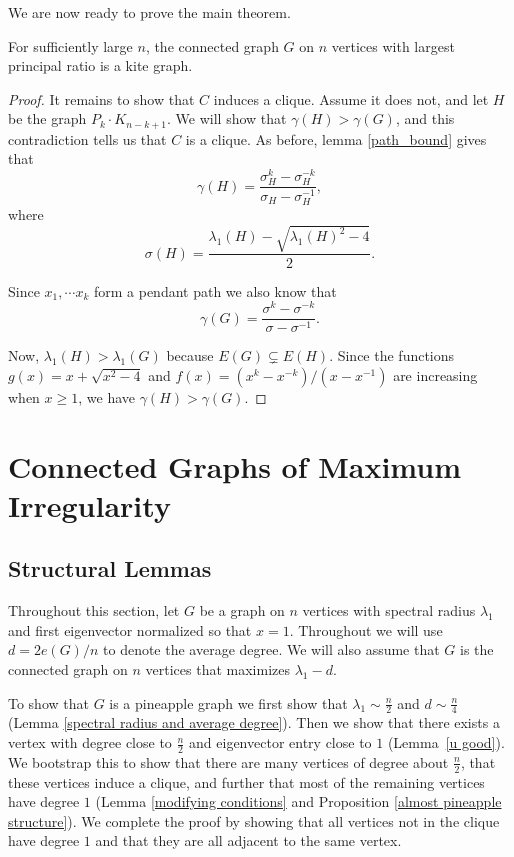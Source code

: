 We are now ready to prove the main theorem.

{
\renewcommand{\thetheorem}{1}
\begin{theorem}
  For sufficiently large $n$, the connected graph $G$ on $n$
  vertices with largest principal ratio is a kite graph.
\end{theorem}
\addtocounter{theorem}{-1}
}
\begin{proof}
  It remains to show that $C$ induces a clique. Assume it does not, and let $H$ be the graph $P_k \cdot K_{n-k+1}$. We will show
  that $\gamma(H) > \gamma(G)$, and this contradiction tells us that $C$ is a clique. As before, lemma \ref{path_bound} gives that
\[
\gamma(H)  = \frac{\sigma_H^k - \sigma_H^{-k}}{\sigma_H - \sigma_H^{-1}},
\]
where
\[
\sigma(H) = \frac{\lambda_1(H) - \sqrt{\lambda_1(H)^2 -4}}{2}.
\]

Since $x_1,\cdots x_k$ form a pendant path we also know that 
\[
\gamma(G) = \frac{\sigma^k - \sigma^{-k}}{\sigma - \sigma^{-1}}.
\]

Now, $\lambda_1(H) > \lambda_1(G)$ because $E(G) \subsetneq E(H)$. Since the functions $g(x) = x+\sqrt{x^2-4}$ and $f(x) = (x^k - x^{-k})/(x-x^{-1})$ are increasing when $x\geq 1$, we have $\gamma(H) > \gamma(G)$.

 \end{proof}



\section{Connected Graphs of Maximum Irregularity}\label{pineapple}

\subsection{Structural Lemmas}
Throughout this section, let $G$ be a graph on $n$ vertices with spectral radius $\lambda_1$ and first eigenvector normalized so that $x=1$. Throughout we will use $d = 2e(G)/n$ to denote the average degree. We will also assume that $G$ is the connected graph on $n$ vertices that maximizes $\lambda_1 - d$.

To show that $G$ is a pineapple graph we first show that $\lambda_1 \sim \frac{n}{2}$ and $d\sim \frac{n}{4}$ (Lemma \ref{spectral radius and average degree}). Then we show that there exists a vertex with degree close to $\frac{n}{2}$ and eigenvector entry close to $1$ (Lemma~\ref{u good}). We bootstrap this to show that there are many vertices of degree about $\frac{n}{2}$, that these vertices induce a clique, and further that most of the remaining vertices have degree $1$ (Lemma \ref{modifying conditions} and Proposition \ref{almost pineapple structure}).  We complete the proof by showing that all vertices not in the clique have degree $1$ and that they are all adjacent to the same vertex.

